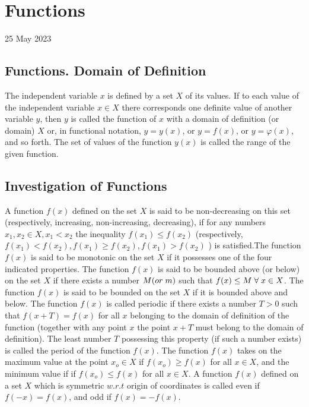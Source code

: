 \documentclass[twocolumn, 10pt]{article}
\begin{document}
\section{Functions}
25 May 2023
\subsection{Functions. Domain of Definition}
The independent variable $x$ is defined by a set $X$ of its values.
If to each value of the independent variable $x \in X$ there corresponds
one definite value of another variable $y$, then $y$ is called
the function of $x$ with a domain of definition (or domain) $X$ or,
in functional notation, $y=y(x)$, or $y=f(x)$, or $y=\varphi(x)$, and so
forth. The set of values of the function $y(x)$ is called the range
of the given function.

\subsection{Investigation of Functions}
A function $f(x)$ defined on the set $X$ is said to be non-decreasing
on this set (respectively, increasing, non-increasing, decreasing), if
for any numbers $x_1,x_2 \in X, x_1<x_2$ the inequality $f(x_1)\le f(x_2)$ (respectively, $f(x_1)<f(x_2),f(x_1)\ge f(x_2),f(x_1)>f(x_2)$ )  is satisfied.The function $f (x)$ is said to be monotonic on the set $X$ if it possesses one of the four indicated properties. The function $f(x)$ is said to be bounded above (or below) on the set $X$ if there exists a number $M(or\thickspace m)$ such that $f(x)\le M \thickspace \forall \thickspace x \in X$.  The function $f(x)$ is said to be bounded on the set $X$ if it is bounded above and below.
The function $f(x)$ is called periodic if there exists a number
$T > 0$ such that $f(x + T)=f(x)$ for all $x$ belonging to the domain
of definition of the function (together with any point $x$ the point
$x+T$ must belong to the domain of definition). The least number $T$
possessing this property (if such a number exists) is called the
period of the function $f(x)$. The function $f(x)$ takes on the maximum value at the point $x_o\in X$ if $f(x_o)\ge f(x)$ for all $x\in X$, and the minimum value if if $f(x_o) \le f(x)$ for all $x \in X$. A function $f(x)$ defined on a set $X$ which is symmetric $w.r.t$ origin of coordinates is called even if $f(-x)=f(x)$, and odd if $f(x)=-f(x)$.
\end{document}
